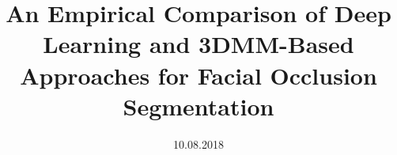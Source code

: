 \documentclass[a4paper, 10pt, oneside]{memoir}
\title				{An Empirical Comparison of Deep Learning and 3DMM-Based Approaches for Facial Occlusion Segmentation}
\date				{10.08.2018}
\begin{document}

\thesisfront
\maketitle
\pagestyle{thesis}


\thesistoc
\thesismain
\frenchspacing





%
%
\thesisappendix
\thesisbib
\begin{appendices}
	 
\end{appendices}
\thesisback

\end{document}
